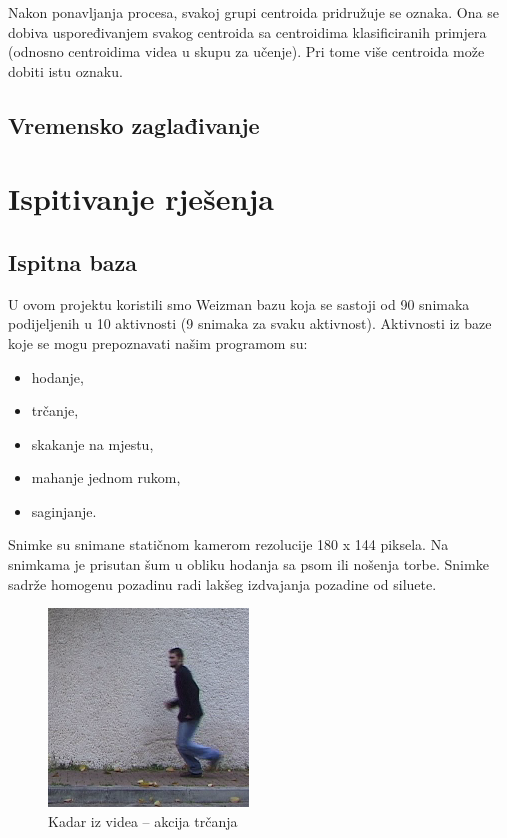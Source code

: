 \documentclass[times, utf8, diplomski]{fer}
\begin{document}
Nakon ponavljanja procesa, svakoj grupi centroida pridružuje se oznaka. Ona se dobiva uspoređivanjem svakog centroida sa centroidima klasificiranih primjera (odnosno centroidima videa u skupu za učenje). Pri tome više centroida može dobiti istu oznaku.

\section{Vremensko zaglađivanje}


\chapter{Ispitivanje rješenja}

\section{Ispitna baza}
U ovom projektu koristili smo Weizman bazu koja se sastoji od 90 snimaka podijeljenih u
10 aktivnosti (9 snimaka za svaku aktivnost). Aktivnosti iz baze koje se mogu
 prepoznavati našim programom su:

\begin{itemize}
\item hodanje,
\item trčanje,
\item skakanje na mjestu,
\item mahanje jednom rukom,
\item saginjanje.
\end{itemize}

Snimke su snimane statičnom kamerom rezolucije 180 x 144 piksela. Na snimkama je 
prisutan šum u obliku hodanja sa psom ili nošenja torbe. Snimke sadrže homogenu pozadinu
radi lakšeg izdvajanja pozadine od siluete.

\begin{figure}[ht!]
\centering
\includegraphics[scale=0.7]{running.png}
\caption{Kadar iz videa -- akcija trčanja}
\label{img:run}
\end{figure}
\end{document}
